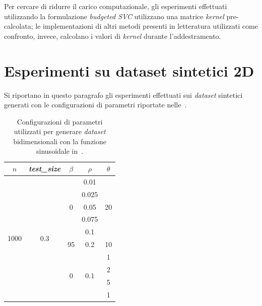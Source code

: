 Per cercare di ridurre il carico computazionale, gli esperimenti effettuati utilizzando la formulazione \emph{budgeted SVC} utilizzano una matrice \emph{kernel} pre-calcolata; le implementazioni di altri metodi presenti in letteratura utilizzati come confronto, invece, calcolano i valori di \emph{kernel} durante l'addestramento.

\section{Esperimenti su dataset sintetici 2D}\label{sec:exp:synth_2d}
Si riportano in questo paragrafo gli esperimenti effettuati sui \emph{dataset} sintetici generati con le configurazioni di parametri riportate nelle~.
\begin{table}
    \centering
    \begin{tabular}{ccccc}
        \toprule
         $n$ & \emph{test\_size} & $\beta$ & $\rho$ & $\theta$ \\
        \midrule
        \multirow{10}{*}{1000} & \multirow{10}{*}{0.3} &\multirow{5}{*}{0}  & 0.01  & \multirow{5}{*}{20} \\        
                            &&& 0.025 &     \\        
                            &&& 0.05  &     \\        
                            &&& 0.075 &     \\        
                            &&& 0.1   &     \\
        \cline{3-5}
                &&  95      & 0.2   & 10    \\   
        \cline{3-5}
        &&  \multirow{4}{*}{0}  & \multirow{4}{*}{0.1}  & 1     \\    
                            &&&                       & 2     \\    
                            &&&                       & 5     \\    
                            &&&                       & 1     \\    
        \bottomrule
    \end{tabular}
    \caption{Configurazioni di parametri utilizzati per generare \emph{dataset} bidimensionali con la funzione sinusoidale in~.}
    \label{tab:parametri_ds_sin}
\end{table}

